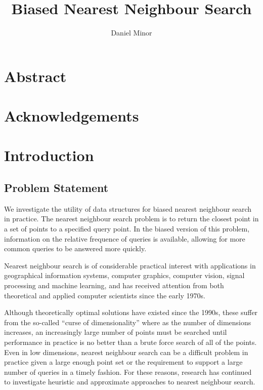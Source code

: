 \documentclass[mcs]{scsthesis}
\title {Biased Nearest Neighbour Search}
\author {Daniel Minor}
\begin{document}
\newtheorem*{thm}{Theorem}[section]

\beforepreface

\prefacesection

\chapter*{Abstract}


\chapter*{Acknowledgements}


\afterpreface

\chapter{Introduction}

\section{Problem Statement}

We investigate the utility of data structures for biased nearest neighbour
search in practice. The nearest neighbour search problem is to return the
closest point in a set of points to a specified query point. In the biased
version of this problem, information on the relative frequence of queries
is available, allowing for more common queries to be answered more quickly.

Nearest neighbour search is of considerable practical interest with
applications in geographical information systems, computer graphics,
computer vision, signal processing and machine learning, and has received
attention from both theoretical and applied computer scientists since the early
1970s.

Although theoretically optimal solutions have existed since the 1990s, these
suffer from the so-called ``curse of dimensionality'' where as the number of
dimensions increases, an increasingly large number of points must be searched
until performance in practice is no better than a brute force search of all of
the points. Even in low dimensions, nearest neighbour search can be a difficult
problem in practice given a large enough point set or the requirement to support
a large number of queries in a timely fashion. For these reasons, research has
continued to investigate heuristic and approximate approaches to nearest
neighbour search. 
 
\end{document}
